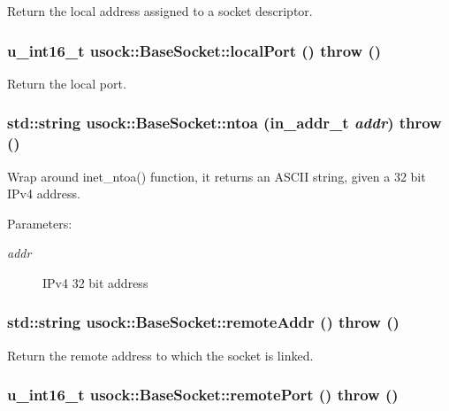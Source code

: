 Return the local address assigned to a socket descriptor. 

\hypertarget{classusock_1_1BaseSocket_47218f0ff53693f2891573ec47d84f36}{
\subsubsection[{localPort}]{\setlength{\rightskip}{0pt plus 5cm}u\_\-int16\_\-t usock::BaseSocket::localPort ()  throw ()}}
\label{classusock_1_1BaseSocket_47218f0ff53693f2891573ec47d84f36}


Return the local port. 

\hypertarget{classusock_1_1BaseSocket_3da108b8c23df3b521ded0bc4ae5295c}{
\subsubsection[{ntoa}]{\setlength{\rightskip}{0pt plus 5cm}std::string usock::BaseSocket::ntoa (in\_\-addr\_\-t {\em addr})  throw ()}}
\label{classusock_1_1BaseSocket_3da108b8c23df3b521ded0bc4ae5295c}


Wrap around inet\_\-ntoa() function, it returns an ASCII string, given a 32 bit IPv4 address. 

\begin{Desc}
\item[Parameters:]
\begin{description}
\item[{\em addr}]IPv4 32 bit address \end{description}
\end{Desc}
\hypertarget{classusock_1_1BaseSocket_3842fc1ea6ac5575e988d4ee620089a7}{
\subsubsection[{remoteAddr}]{\setlength{\rightskip}{0pt plus 5cm}std::string usock::BaseSocket::remoteAddr ()  throw ()}}
\label{classusock_1_1BaseSocket_3842fc1ea6ac5575e988d4ee620089a7}


Return the remote address to which the socket is linked. 

\hypertarget{classusock_1_1BaseSocket_e4e09d33779e097ada03144ff54286aa}{
\subsubsection[{remotePort}]{\setlength{\rightskip}{0pt plus 5cm}u\_\-int16\_\-t usock::BaseSocket::remotePort ()  throw ()}}
\label{classusock_1_1BaseSocket_e4e09d33779e097ada03144ff54286aa}


